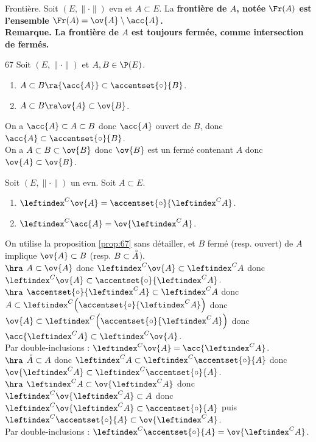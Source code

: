 \documentclass[11pt]{article}
\begin{document}
\begin{defi}{Frontière.}{}
    Soit $(E,\|\cdot\|)$ evn et $A\subset E$. La \bf{frontière} de $A$, notée $\Fr(A)$ est l'ensemble $\Fr(A)=\ov{A}\setminus{\acc{A}}$.\\
    \bf{Remarque.} La frontière de $A$ est toujours fermée, comme intersection de fermés.
\end{defi}

\vspace*{-0.8cm}

\begin{thm}{}{67}
    Soit $(E,\|\cdot\|)$ et $A,B\in\P(E)$.
    \begin{enumerate}
        \item $A\subset B \ra {\acc{A}}\subset\accentset{\circ}{B}$.
        \item $A\subset B \ra \ov{A}\subset\ov{B}$.
    \end{enumerate}
    \tcblower
     On a ${\acc{A}}\subset A \subset B$ donc ${\acc{A}}$ ouvert de $B$, donc ${\acc{A}}\subset\accentset{\circ}{B}$.\\
     On a $A\subset B \subset \ov{B}$ donc $\ov{B}$ est un fermé contenant $A$ donc $\ov{A}\subset\ov{B}$.
\end{thm}

\vspace*{-0.8cm}

\renewcommand*{\A}{\accentset{\circ}{A}}
\renewcommand*{\c}{\leftindex^C}

\begin{lemme}{}{}
    Soit $(E,\|\cdot\|)$ un evn. Soit $A\subset E$.
    \begin{enumerate}
        \item $\leftindex^C{\ov{A}}=\accentset{\circ}{\leftindex^CA}$.
        \item $\leftindex^C{\acc{A}}=\ov{\leftindex^CA}$.
    \end{enumerate} 
    \tcblower
    On utilise la proposition \ref{prop:67} sans détailler, et $B$ fermé (resp. ouvert) de $A$ implique $\ov{A}\subset B$ (resp. $B \subset \A$).\\
    $\hra$ $A\subset\ov{A}$ donc $\c{\ov{A}}\subset\c{A}$ donc $\c{\ov{A}}\subset\accentset{\circ}{\c{A}}$.\\
    $\hra$ $\accentset{\circ}{\c{A}}\subset\c{A}$ donc $A \subset \c{\left(\accentset{\circ}{\c{A}}\right)}$ donc $\ov{A}\subset \c{\left(\accentset{\circ}{\c{A}}\right)}$ donc $\acc{\c{A}} \subset \c{\ov{A}}$.\\
    Par double-inclusions : $\c{\ov{A}}=\acc{\c{A}}$.\\
    $\hra$ $\A \subset A$ donc $\c{A}\subset\c{\A}$ donc $\ov{\c A} \subset \c{\A}$.\\
    $\hra$ $\c{A}\subset\ov{\c{A}}$ donc $\c{\ov{\c{A}}}\subset A$ donc $\c{\ov{\c{A}}}\subset\A$ puis $\c{\A}\subset\ov{\c{A}}$.\\
    Par double-inclusions : $\c{\A}=\ov{\c{A}}$.
\end{lemme}
\end{document}
